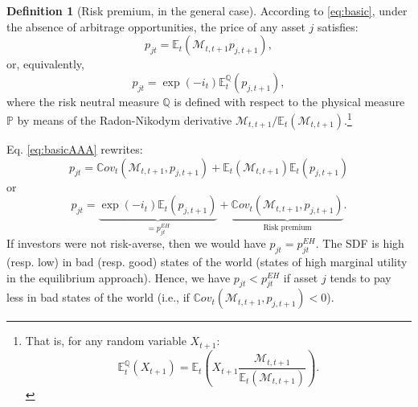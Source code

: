 \documentclass[
  12pt,
]{book}
\theoremstyle{definition}
\newtheorem{definition}{Definition}[chapter]
\theoremstyle{definition}
\theoremstyle{definition}
\theoremstyle{definition}
\theoremstyle{remark}
\begin{document}
\begin{definition}[Risk premium, in the general case]
\protect\hypertarget{def:RPremium}{}\label{def:RPremium}According to \eqref{eq:basic}, under the absence of arbitrage opportunities, the price of any asset \(j\) satisfies:
\begin{equation}
p_{jt} = \mathbb{E}_t(\mathcal{M}_{t,t+1} p_{j,t+1}),\label{eq:basicAAA}
\end{equation}
or, equivalently,
\[
p_{jt} = \exp(-i_t)\mathbb{E}^{\mathbb{Q}}_t(p_{j,t+1}),
\]
where the risk neutral measure \(\mathbb{Q}\) is defined with respect to the physical measure \(\mathbb{P}\) by means of the Radon-Nikodym derivative \(\mathcal{M}_{t,t+1}\big/\mathbb{E}_t(\mathcal{M}_{t,t+1})\).\footnote{That is, for any random variable \(X_{t+1}\):
  \[
  \mathbb{E}^{\mathbb{Q}}_t(X_{t+1})=\mathbb{E}_t\left(X_{t+1}\frac{\mathcal{M}_{t,t+1}}{\mathbb{E}_t(\mathcal{M}_{t,t+1})}\right).
  \]}

Eq. \eqref{eq:basicAAA} rewrites:
\[
p_{jt} =  \mathbb{C}ov_t(\mathcal{M}_{t,t+1}, p_{j,t+1}) + \mathbb{E}_t(\mathcal{M}_{t,t+1})\mathbb{E}_t( p_{j,t+1})
\]
or
\begin{equation}
p_{jt} = \underbrace{\exp(-i_t)\mathbb{E}_t( p_{j,t+1})}_{=p^{EH}_{jt}} + \underbrace{\mathbb{C}ov_t(\mathcal{M}_{t,t+1}, p_{j,t+1})}_{\mbox{Risk premium}}.\label{eq:CovRP}
\end{equation}
If investors were not risk-averse, then we would have \(p_{jt} = p^{EH}_{jt}\). The SDF is high (resp. low) in bad (resp. good) states of the world (states of high marginal utility in the equilibrium approach). Hence, we have \(p_{jt}< p^{EH}_{jt}\) if asset \(j\) tends to pay less in bad states of the world (i.e., if \(\mathbb{C}ov_t(\mathcal{M}_{t,t+1}, p_{j,t+1})<0\)).
\end{definition}
\end{document}
